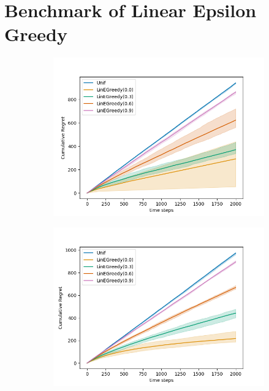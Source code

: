 \section{Benchmark of \textbf{Linear Epsilon Greedy}}
\begin{figure}[H]
  \centering
  \begin{subfigure}{0.45\textwidth}
      \centering
      \includegraphics[width=\linewidth]{plots/regret_e_greedy_fixed_actions.png}
  \end{subfigure}
  \begin{subfigure}{0.45\textwidth}
      \centering
      \includegraphics[width=\linewidth]{plots/regret_e_greedy_varying_actions.png}
  \end{subfigure}

\end{figure}
